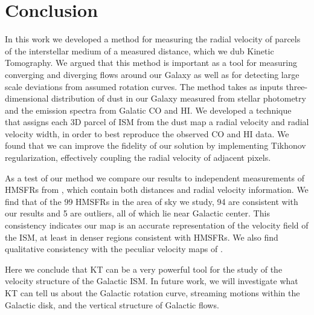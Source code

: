 \section{Conclusion}
\label{sec:conclusion}

In this work we developed a method for measuring the radial velocity of parcels of the interstellar medium of a measured distance, which we dub  Kinetic Tomography. We argued that this method is important as a tool for measuring converging and diverging flows around our Galaxy as well as for detecting large scale deviations from assumed rotation curves. The method takes as inputs three-dimensional distribution of dust in our Galaxy measured from stellar photometry and the emission spectra from Galatic CO and HI. We developed a technique that assigns each 3D parcel of ISM from the dust map a radial velocity and radial velocity width, in order to best reproduce the observed CO and HI data. We found that we can improve the fidelity of our solution by implementing Tikhonov regularization, effectively coupling the radial velocity of adjacent pixels. 

As a test of our method we compare our results to independent measurements of HMSFRs from \Reid{}, which contain both distances and radial velocity information. We find that of the 99 HMSFRs in the area of sky we study, 94 are consistent with our results and 5 are outliers, all of which lie near Galactic center. This consistency indicates our map is an accurate representation of the velocity field of the ISM, at least in denser regions consistent with HMSFRs. We also find qualitative consistency with the peculiar velocity maps of \citet{1993A&A...275...67B}. 

Here we conclude that KT can be a very powerful tool for the study of the velocity structure of the Galactic ISM. In future work, we will investigate what KT can tell us about the Galactic rotation curve, streaming motions within the Galactic disk, and the vertical structure of Galactic flows.


